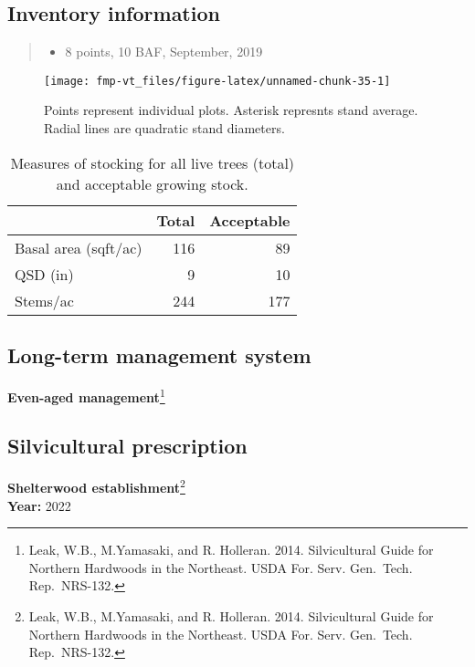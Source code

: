 \documentclass[]{tufte-handout}
\providecommand{\tightlist}{%
  \setlength{\itemsep}{0pt}\setlength{\parskip}{0pt}}
\begin{document}
\subsection{Inventory information}\label{inventory-information-6}

\begin{quote}
\begin{itemize}
\tightlist
\item
  8 points, 10 BAF, September, 2019
\end{itemize}
\end{quote}

\begin{figure}
\texttt{[image: fmp-vt\_files/figure-latex/unnamed-chunk-35-1]} \caption[Points represent individual plots]{Points represent individual plots. Asterisk represnts stand average. Radial lines are quadratic stand diameters.}\label{fig:unnamed-chunk-35}
\end{figure}

\begin{table}

\caption{\label{tab:unnamed-chunk-36}Measures of stocking for all live trees (total) and acceptable growing stock.}
\centering
\begin{tabular}[t]{lrr}
\toprule
  & Total & Acceptable\\
\midrule
Basal area (sqft/ac) & 116 & 89\\
QSD (in) & 9 & 10\\
Stems/ac & 244 & 177\\
\bottomrule
\end{tabular}
\end{table}

\subsection{Long-term management
system}\label{long-term-management-system-6}

\textbf{Even-aged management}\footnote{Leak, W.B., M.Yamasaki, and R.
  Holleran. 2014. Silvicultural Guide for Northern Hardwoods in the
  Northeast. USDA For. Serv. Gen.~Tech. Rep.~NRS-132.}

\subsection{Silvicultural
prescription}\label{silvicultural-prescription-6}

\textbf{Shelterwood establishment}\footnote{Leak, W.B., M.Yamasaki, and
  R. Holleran. 2014. Silvicultural Guide for Northern Hardwoods in the
  Northeast. USDA For. Serv. Gen.~Tech. Rep.~NRS-132.}\\
\textbf{Year:} 2022

\newpage
\end{document}
